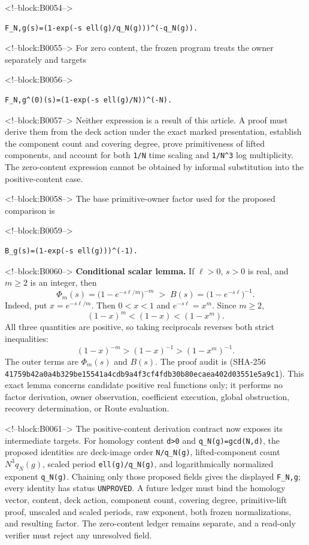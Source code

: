 \documentclass[11pt]{article}
\begin{document}
<!--block:B0054-->
\begin{verbatim}
F_N,g(s)=(1-exp(-s ell(g)/q_N(g)))^(-q_N(g)).
\end{verbatim}

<!--block:B0055-->
For zero content, the frozen program treats the owner separately and
targets

<!--block:B0056-->
\begin{verbatim}
F_N,g^(0)(s)=(1-exp(-s ell(g)/N))^(-N).
\end{verbatim}

<!--block:B0057-->
Neither expression is a result of this article. A proof must derive them from
the deck action under the exact marked presentation, establish the
component count and covering degree, prove primitiveness of lifted
components, and account for both \texttt{1/N} time scaling and
\texttt{1/N\^{}3} log multiplicity. The zero-content expression cannot
be obtained by informal substitution into the positive-content case.

<!--block:B0058-->
The base primitive-owner factor used for the proposed comparison is

<!--block:B0059-->
\begin{verbatim}
B_g(s)=(1-exp(-s ell(g)))^(-1).
\end{verbatim}

<!--block:B0060-->
\textbf{Conditional scalar lemma.}  If \(\ell>0\), \(s>0\) is real, and
\(m\geq2\) is an integer, then
\[
 \Phi_m(s)=\bigl(1-e^{-s\ell/m}\bigr)^{-m}
 \;>\;
 B(s)=\bigl(1-e^{-s\ell}\bigr)^{-1}.
\]
Indeed, put \(x=e^{-s\ell/m}\).  Then \(0<x<1\) and
\(e^{-s\ell}=x^m\).  Since \(m\geq2\),
\[
 (1-x)^m<(1-x)<(1-x^m).
\]
All three quantities are positive, so taking reciprocals reverses both strict
inequalities:
\[
 (1-x)^{-m}>(1-x)^{-1}>(1-x^m)^{-1}.
\]
The outer terms are \(\Phi_m(s)\) and \(B(s)\).  The proof audit is
(SHA-256 \texttt{41759b42\allowbreak{}a0a4b329\allowbreak{}be15541a\allowbreak{}4cdb9a4f\allowbreak{}3cf4fdb3\allowbreak{}0b80ecae\allowbreak{}a402d035\allowbreak{}51e5a9c1}).  This exact lemma concerns candidate positive real
functions only; it performs no factor derivation, owner observation, coefficient
execution, global obstruction, recovery determination, or Route evaluation.

<!--block:B0061-->
The positive-content derivation contract now exposes its intermediate
targets. For homology content \texttt{d>0} and
\texttt{q\_N(g)=gcd(N,d)}, the proposed identities are deck-image order
\texttt{N/q\_N(g)}, lifted-component count
\(N^3 q_N(g)\), scaled period \texttt{ell(g)/q\_N(g)}, and logarithmically
normalized exponent \texttt{q\_N(g)}. Chaining only those proposed fields
gives the displayed \texttt{F\_N,g}; every identity has status
\texttt{UNPROVED}. A future ledger must bind the homology vector, content, deck
action, component count, covering degree, primitive-lift proof, unscaled and
scaled periods, raw exponent, both frozen normalizations, and resulting factor.
The zero-content ledger remains separate, and a read-only verifier must reject
any unresolved field.
\end{document}
